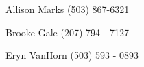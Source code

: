 

\begin{cvhonors}

  \cvhonor
    {Allison Marks} %
    {(503) 867-6321} %

  \cvhonor
    {Brooke Gale} %
    {(207) 794 - 7127} %


\cvhonor
    {Eryn VanHorn} %
    {(503) 593 - 0893} %

\end{cvhonors}
